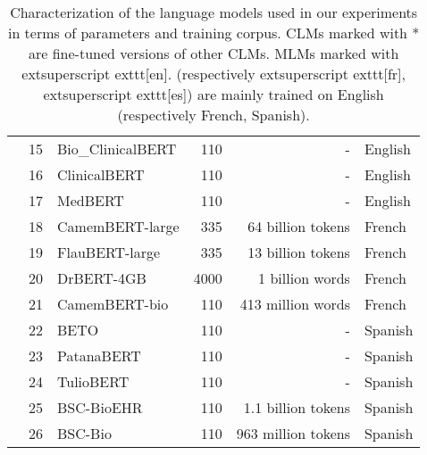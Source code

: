 \begin{table}[ht]
{\begin{tabular}{cllrrl}
 & 15 & Bio\_ClinicalBERT \cite{alsentzer2019publicly} & 110 & - & English \\
 & 16 & ClinicalBERT \cite{wang2023optimized} & 110 & - & English \\
 & 17 & MedBERT \cite{charangan2022medbert} & 110 & - & English \\
 & 18 & CamemBERT-large \cite{martin2019camembert} & 335 & 64 billion tokens & French \\
 & 19 & FlauBERT-large \cite{le2019flaubert} & 335 & 13 billion tokens & French \\
 & 20 & DrBERT-4GB \cite{labrak2023drbert} & 4000 & 1 billion words & French \\
 & 21 & CamemBERT-bio \cite{touchent2023camembertbio} & 110 & 413 million words & French \\
 & 22 & BETO \cite{canete2020beto} & 110 & - & Spanish \\
 & 23 & PatanaBERT & 110 & - & Spanish \\
 & 24 & TulioBERT & 110 & - & Spanish \\
 & 25 & BSC-BioEHR \cite{carrino2022pretrained} & 110 & 1.1 billion tokens & Spanish \\
 & 26 & BSC-Bio \cite{carrino2022pretrained} & 110 & 963 million tokens & Spanish \\
\bottomrule
\end{tabular}}
\caption{Characterization of the language models used in our experiments in terms of parameters and training corpus. CLMs marked with * are fine-tuned versions of other CLMs. MLMs marked with 	extsuperscript{	exttt{[en]}.} (respectively 	extsuperscript{	exttt{[fr]}}, 	extsuperscript{	exttt{[es]}}) are mainly trained on English (respectively French, Spanish).}
\label{tab:LM_features}
\end{table}
